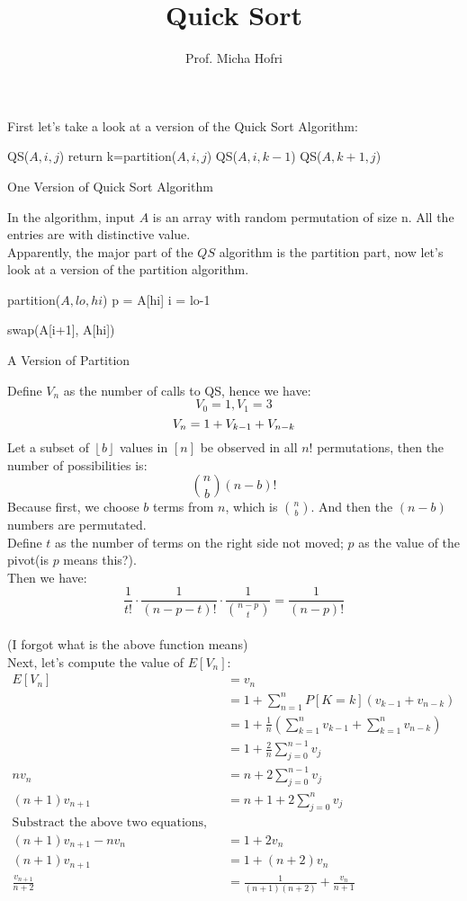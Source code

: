 \documentclass{article}
\title{Quick Sort}
\author{Prof. Micha Hofri}
\begin{document}
\maketitle
First let's take a look at a version of the Quick Sort Algorithm:\\
\begin{algorithm}[H]
QS($A, i, j$)\;
 {return\;}
k=partition($A, i, j$)\;
QS($A, i, k-1$)\;
QS($A, k+1, j$)\;
\caption{One Version of Quick Sort Algorithm}
\end{algorithm}
In the algorithm, input $A$ is an array with random permutation of
size n. All the entries are with distinctive value.\\
Apparently, the major part of the $QS$ algorithm is the partition
part, now let's look at a version of the partition algorithm.\\
\begin{algorithm}[H]
partition($A, lo, hi$)\;
p = A[hi]\;
i = lo-1\;
 {
}

swap(A[i+1], A[hi])\;
\caption{A Version of Partition}
\end{algorithm}
Define $V_n$ as the number of calls to QS, hence we have:\\
\[
V_0=1, V_1=3 
\]
\[
V_n=1+V_{k-1}+V_{n-k} \\
\]
Let a subset of $\left\lfloor{b}\right\rfloor$ values in $[n]$ be observed in all $n!$
permutations, then the number of possibilities is:\\
\[\binom{n}{b}(n-b)!\]
Because first, we choose $b$ terms from $n$, which is
$\binom{n}{b}$. And then the $(n-b)$ numbers are permutated.\\
Define $t$ as the number of terms on the right side not moved; $p$ as
the value of the pivot(is $p$ means this?).\\
Then we have:\\
\[\frac{1}{t!}\cdot\frac{1}{(n-p-t)!}\cdot\frac{1}{\binom{n-p}{t}}=\frac{1}{(n-p)!}\]\\
(I forgot what is the above function means) \\
Next, let's compute the value of $E[V_n]$:
\begin{align*}
E[V_n]&=v_n\\
&=1+\sum_{n=1}^nP[K=k](v_{k-1}+v_{n-k}) \\
&=1+\frac{1}{n}(\sum_{k=1}^nv_{k-1}+\sum_{k=1}^nv_{n-k}) \\
&=1+\frac{2}{n}\sum_{j=0}^{n-1}v_j \\
nv_n&=n+2\sum_{j=0}^{n-1}v_j \\
(n+1)v_{n+1}&=n+1+2\sum_{j=0}^nv_j \\
\text{Substract the above two equations, we get:}\\
(n+1)v_{n+1}-nv_n&=1+2v_n\\
(n+1)v_{n+1}&=1+(n+2)v_n \\
\frac{v_{n+1}}{n+2}&=\frac{1}{(n+1)(n+2)}+\frac{v_n}{n+1} \\
\end{align*}
\end{document}
